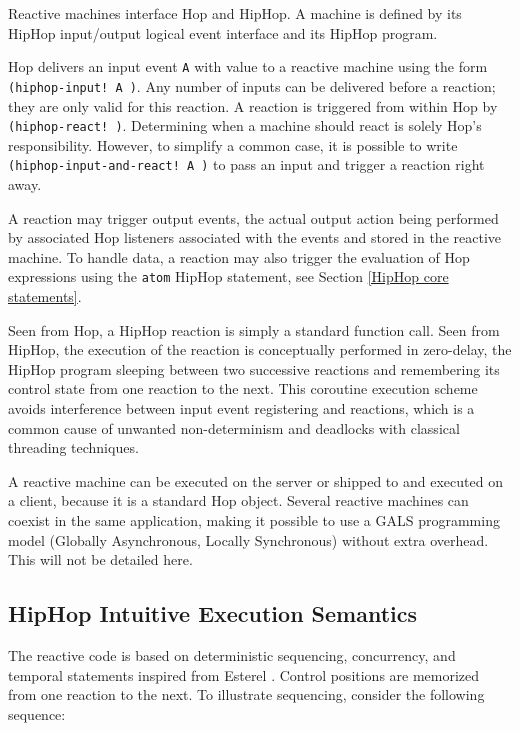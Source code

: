 \documentclass{llncs}
\begin{document}
Reactive machines interface Hop and HipHop. A machine 
is defined by its HipHop input/output logical event interface and its
HipHop program. 

Hop delivers an input event {\texttt{A}} with value  to a reactive machine  
using the form {\texttt{(hiphop-input!  A )}}. Any number of inputs can be delivered
before a reaction; they are only valid for this reaction.
A reaction is triggered from within Hop by
{\texttt{(hiphop-react! )}}. Determining when a machine should react is
solely Hop's responsibility. However, to simplify a common case,
it is possible to write {\texttt{(hiphop-input-and-react!  A
)}} to pass an input and trigger a reaction right away.

A reaction may trigger output events, the actual output action being
performed by associated Hop listeners associated with the events and
stored in the reactive machine. To handle data, a reaction may also
trigger the evaluation of Hop expressions using the
{\texttt{atom{}}} HipHop statement, see Section \ref{HipHop core
  statements}.

Seen from Hop, a HipHop reaction is simply a standard function
call. Seen from HipHop, the execution of the reaction is conceptually
performed in zero-delay, the HipHop program sleeping between two
successive reactions and remembering its control state from one reaction to the next.
This coroutine execution
scheme avoids interference between input event registering and
reactions, which is a common cause of unwanted non-determinism and
deadlocks with classical threading techniques.

A reactive machine can be executed on the server or
shipped to and executed on a client, because it is a standard Hop
object. Several reactive machines can coexist in the
same application, making it possible to use a GALS programming model
(Globally Asynchronous, Locally Synchronous) without extra overhead.
This will not be detailed here.

\subsection{HipHop Intuitive Execution Semantics}
\label{HipHop Intuitive Execution Semantics}

The reactive code is based on deterministic sequencing,
concurrency, and temporal statements inspired from Esterel
\cite{berry2000foundations}. Control positions are memorized from one
reaction to the next. To illustrate sequencing, consider the following sequence:
\end{document}
